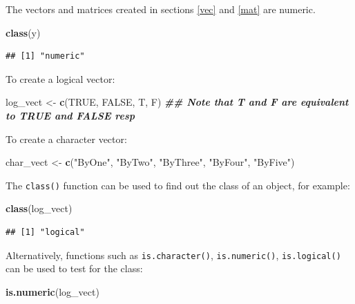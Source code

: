 \documentclass[
]{book}
\newenvironment{Shaded}{\begin{snugshade}}{\end{snugshade}}
\newcommand{\ConstantTok}[1]{\textcolor[rgb]{0.56,0.35,0.01}{#1}}
\newcommand{\DocumentationTok}[1]{\textcolor[rgb]{0.56,0.35,0.01}{\textbf{\textit{#1}}}}
\newcommand{\FunctionTok}[1]{\textcolor[rgb]{0.13,0.29,0.53}{\textbf{#1}}}
\newcommand{\NormalTok}[1]{#1}
\newcommand{\OtherTok}[1]{\textcolor[rgb]{0.56,0.35,0.01}{#1}}
\newcommand{\StringTok}[1]{\textcolor[rgb]{0.31,0.60,0.02}{#1}}
\theoremstyle{definition}
\theoremstyle{definition}
\theoremstyle{definition}
\theoremstyle{definition}
\theoremstyle{remark}
\begin{document}
The vectors and matrices created in sections \ref{vec} and \ref{mat} are numeric.

\begin{Shaded}
\begin{Highlighting}[]
\FunctionTok{class}\NormalTok{(y)}
\end{Highlighting}
\end{Shaded}

\begin{verbatim}
## [1] "numeric"
\end{verbatim}

To create a logical vector:

\begin{Shaded}
\begin{Highlighting}[]
\NormalTok{log\_vect }\OtherTok{\textless{}{-}} \FunctionTok{c}\NormalTok{(}\ConstantTok{TRUE}\NormalTok{, }\ConstantTok{FALSE}\NormalTok{, T, F)}
\DocumentationTok{\#\# Note that T and F are equivalent to TRUE and FALSE resp}
\end{Highlighting}
\end{Shaded}

To create a character vector:

\begin{Shaded}
\begin{Highlighting}[]
\NormalTok{char\_vect }\OtherTok{\textless{}{-}} \FunctionTok{c}\NormalTok{(}\StringTok{"ByOne"}\NormalTok{, }\StringTok{"ByTwo"}\NormalTok{, }\StringTok{"ByThree"}\NormalTok{, }\StringTok{"ByFour"}\NormalTok{, }\StringTok{"ByFive"}\NormalTok{)}
\end{Highlighting}
\end{Shaded}

The \texttt{class()} function can be used to find out the class of an object, for example:

\begin{Shaded}
\begin{Highlighting}[]
\FunctionTok{class}\NormalTok{(log\_vect)}
\end{Highlighting}
\end{Shaded}

\begin{verbatim}
## [1] "logical"
\end{verbatim}

Alternatively, functions such as \texttt{is.character()}, \texttt{is.numeric()}, \texttt{is.logical()} can be used to test for the class:

\begin{Shaded}
\begin{Highlighting}[]
\FunctionTok{is.numeric}\NormalTok{(log\_vect)}
\end{Highlighting}
\end{Shaded}
\end{document}
